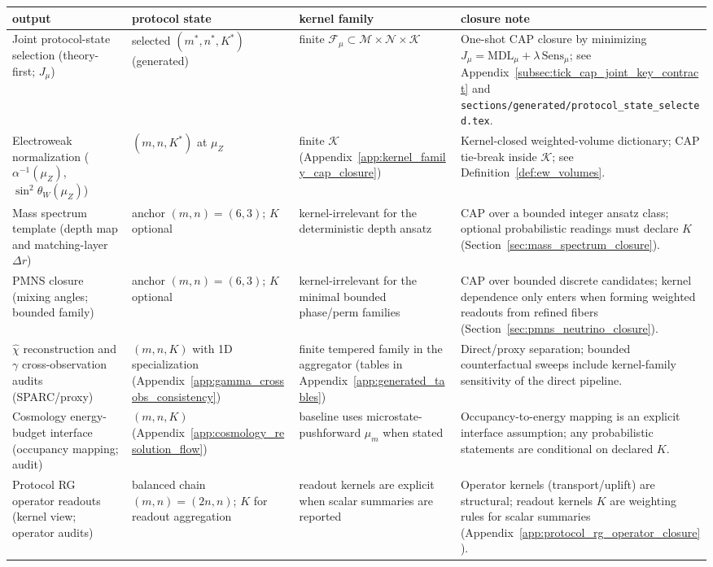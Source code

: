 \begin{center}
\scriptsize
\setlength{\tabcolsep}{6pt}
\renewcommand{\arraystretch}{1.15}
\begin{tabular}{p{} p{} p{} p{}}
\toprule
output & protocol state & kernel family & closure note \\
\midrule
Joint protocol-state selection (theory-first; $J_\mu$) & selected $(m^\ast,n^\ast,K^\ast)$ (generated) & finite $\mathcal{F}_\mu\subset\mathcal{M}\times\mathcal{N}\times\mathcal{K}$ & One-shot CAP closure by minimizing $J_\mu=\mathrm{MDL}_\mu+\lambda\,\mathrm{Sens}_\mu$; see Appendix~\ref{subsec:tick_cap_joint_key_contract} and \texttt{sections/generated/protocol\_state\_selected.tex}. \\
Electroweak normalization ($\alpha^{-1}(\mu_Z)$, $\sin^2\theta_W(\mu_Z)$) & $(m,n,K^\ast)$ at $\mu_Z$ & finite $\mathcal{K}$ (Appendix~\ref{app:kernel_family_cap_closure}) & Kernel-closed weighted-volume dictionary; CAP tie-break inside $\mathcal{K}$; see Definition~\ref{def:ew_volumes}. \\
Mass spectrum template (depth map and matching-layer $\Delta r$) & anchor $(m,n)=(6,3)$; $K$ optional & kernel-irrelevant for the deterministic depth ansatz & CAP over a bounded integer ansatz class; optional probabilistic readings must declare $K$ (Section~\ref{sec:mass_spectrum_closure}). \\
PMNS closure (mixing angles; bounded family) & anchor $(m,n)=(6,3)$; $K$ optional & kernel-irrelevant for the minimal bounded phase/perm families & CAP over bounded discrete candidates; kernel dependence only enters when forming weighted readouts from refined fibers (Section~\ref{sec:pmns_neutrino_closure}). \\
$\widehat\chi$ reconstruction and $\gamma$ cross-observation audits (SPARC/proxy) & $(m,n,K)$ with 1D specialization (Appendix~\ref{app:gamma_crossobs_consistency}) & finite tempered family in the aggregator (tables in Appendix~\ref{app:generated_tables}) & Direct/proxy separation; bounded counterfactual sweeps include kernel-family sensitivity of the direct pipeline. \\
Cosmology energy-budget interface (occupancy mapping; audit) & $(m,n,K)$ (Appendix~\ref{app:cosmology_resolution_flow}) & baseline uses microstate-pushforward $\mu_m$ when stated & Occupancy-to-energy mapping is an explicit interface assumption; any probabilistic statements are conditional on declared $K$. \\
Protocol RG operator readouts (kernel view; operator audits) & balanced chain $(m,n)=(2n,n)$; $K$ for readout aggregation & readout kernels are explicit when scalar summaries are reported & Operator kernels (transport/uplift) are structural; readout kernels $K$ are weighting rules for scalar summaries (Appendix~\ref{app:protocol_rg_operator_closure}). \\

\end{tabular}
\end{center}
